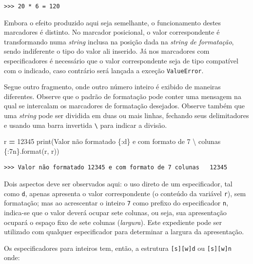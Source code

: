 \documentclass[
]{book}
\newenvironment{Shaded}{\begin{snugshade}}{\end{snugshade}}
\newcommand{\BuiltInTok}[1]{#1}
\newcommand{\DecValTok}[1]{\textcolor[rgb]{0.00,0.00,0.81}{#1}}
\newcommand{\NormalTok}[1]{#1}
\newcommand{\OperatorTok}[1]{\textcolor[rgb]{0.81,0.36,0.00}{\textbf{#1}}}
\newcommand{\SpecialCharTok}[1]{\textcolor[rgb]{0.00,0.00,0.00}{#1}}
\newcommand{\StringTok}[1]{\textcolor[rgb]{0.31,0.60,0.02}{#1}}
\begin{document}
\begin{verbatim}
>>> 20 * 6 = 120
\end{verbatim}

Embora o efeito produzido aqui seja semelhante, o funcionamento destes marcadores é distinto. No marcador posicional, o valor correspondente é transformando numa \emph{string} inclusa na posição dada na \emph{string de formatação}, sendo indiferente o tipo do valor ali inserido. Já nos marcadores com especificadores é necessário que o valor correspondente seja de tipo compatível com o indicado, caso contrário será lançada a exceção \texttt{ValueError}.

Segue outro fragmento, onde outro número inteiro é exibido de maneiras diferentes. Observe que o padrão de formatação pode conter uma mensagem na qual se intercalam os marcadores de formatação desejados. Observe também que uma \emph{string} pode ser dividida em duas ou mais linhas, fechando seus delimitadores e usando uma barra invertida \texttt{\textbackslash{}} para indicar a divisão.

\begin{Shaded}
\begin{Highlighting}[]
\NormalTok{r }\OperatorTok{=} \DecValTok{12345}
\BuiltInTok{print}\NormalTok{(}\StringTok{\textquotesingle{}Valor não formatado }\SpecialCharTok{\{:d\}}\StringTok{ e com formato de 7 \textquotesingle{}}\NormalTok{ \textbackslash{}}
    \StringTok{\textquotesingle{}colunas }\SpecialCharTok{\{:7n\}}\StringTok{\textquotesingle{}}\NormalTok{.}\BuiltInTok{format}\NormalTok{(r, r))}
\end{Highlighting}
\end{Shaded}

\begin{verbatim}
>>> Valor não formatado 12345 e com formato de 7 colunas   12345
\end{verbatim}

Dois aspectos deve ser observados aqui: o uso direto de um especificador, tal como \texttt{d}, apenas apresenta o valor correspondente (o conteúdo da variável \texttt{r}), sem formatação; mas ao acrescentar o inteiro \texttt{7} como prefixo do especificador \texttt{n}, indica-se que o valor deverá ocupar sete colunas, ou seja, sua apresentação ocupará o espaço fixo de sete colunas (\emph{largura}). Este expediente pode ser utilizado com qualquer especificador para determinar a largura da apresentação.

Os especificadores para inteiros tem, então, a estrutura \texttt{{[}s{]}{[}w{]}d} ou \texttt{{[}s{]}{[}w{]}n} onde:
\end{document}
